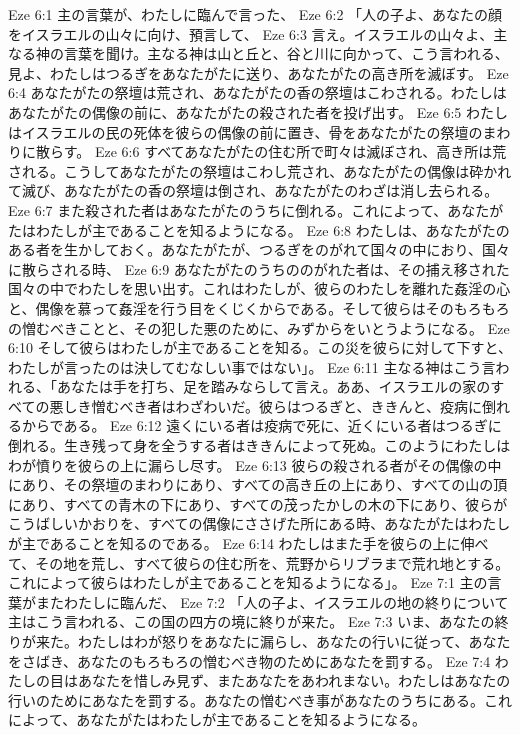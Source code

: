 Eze 6:1  主の言葉が、わたしに臨んで言った、
Eze 6:2  「人の子よ、あなたの顔をイスラエルの山々に向け、預言して、
Eze 6:3  言え。イスラエルの山々よ、主なる神の言葉を聞け。主なる神は山と丘と、谷と川に向かって、こう言われる、見よ、わたしはつるぎをあなたがたに送り、あなたがたの高き所を滅ぼす。
Eze 6:4  あなたがたの祭壇は荒され、あなたがたの香の祭壇はこわされる。わたしはあなたがたの偶像の前に、あなたがたの殺された者を投げ出す。
Eze 6:5  わたしはイスラエルの民の死体を彼らの偶像の前に置き、骨をあなたがたの祭壇のまわりに散らす。
Eze 6:6  すべてあなたがたの住む所で町々は滅ぼされ、高き所は荒される。こうしてあなたがたの祭壇はこわし荒され、あなたがたの偶像は砕かれて滅び、あなたがたの香の祭壇は倒され、あなたがたのわざは消し去られる。
Eze 6:7  また殺された者はあなたがたのうちに倒れる。これによって、あなたがたはわたしが主であることを知るようになる。
Eze 6:8  わたしは、あなたがたのある者を生かしておく。あなたがたが、つるぎをのがれて国々の中におり、国々に散らされる時、
Eze 6:9  あなたがたのうちののがれた者は、その捕え移された国々の中でわたしを思い出す。これはわたしが、彼らのわたしを離れた姦淫の心と、偶像を慕って姦淫を行う目をくじくからである。そして彼らはそのもろもろの憎むべきことと、その犯した悪のために、みずからをいとうようになる。
Eze 6:10  そして彼らはわたしが主であることを知る。この災を彼らに対して下すと、わたしが言ったのは決してむなしい事ではない」。
Eze 6:11  主なる神はこう言われる、「あなたは手を打ち、足を踏みならして言え。ああ、イスラエルの家のすべての悪しき憎むべき者はわざわいだ。彼らはつるぎと、ききんと、疫病に倒れるからである。
Eze 6:12  遠くにいる者は疫病で死に、近くにいる者はつるぎに倒れる。生き残って身を全うする者はききんによって死ぬ。このようにわたしはわが憤りを彼らの上に漏らし尽す。
Eze 6:13  彼らの殺される者がその偶像の中にあり、その祭壇のまわりにあり、すべての高き丘の上にあり、すべての山の頂にあり、すべての青木の下にあり、すべての茂ったかしの木の下にあり、彼らがこうばしいかおりを、すべての偶像にささげた所にある時、あなたがたはわたしが主であることを知るのである。
Eze 6:14  わたしはまた手を彼らの上に伸べて、その地を荒し、すべて彼らの住む所を、荒野からリブラまで荒れ地とする。これによって彼らはわたしが主であることを知るようになる」。
Eze 7:1  主の言葉がまたわたしに臨んだ、
Eze 7:2  「人の子よ、イスラエルの地の終りについて主はこう言われる、この国の四方の境に終りが来た。
Eze 7:3  いま、あなたの終りが来た。わたしはわが怒りをあなたに漏らし、あなたの行いに従って、あなたをさばき、あなたのもろもろの憎むべき物のためにあなたを罰する。
Eze 7:4  わたしの目はあなたを惜しみ見ず、またあなたをあわれまない。わたしはあなたの行いのためにあなたを罰する。あなたの憎むべき事があなたのうちにある。これによって、あなたがたはわたしが主であることを知るようになる。
